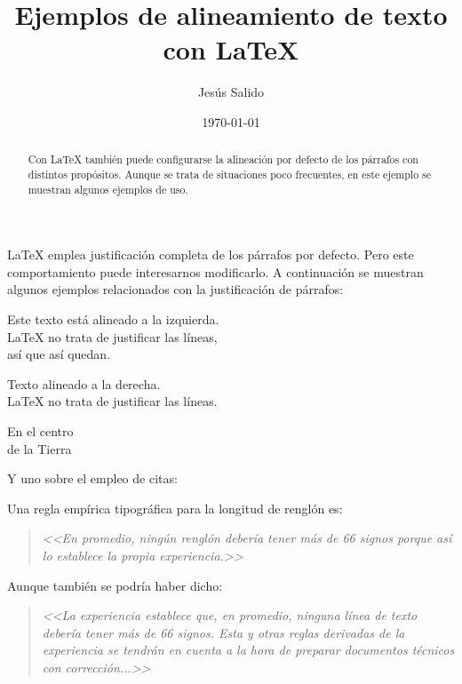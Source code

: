 \documentclass[11pt,a4paper]{article}
\title{Ejemplos de alineamiento de texto con \LaTeX}
\author{Jesús Salido}
\date{\today}
\begin{document}
\maketitle

\begin{abstract}
	Con \LaTeX{} también puede configurarse la alineación por defecto de los párrafos con distintos propósitos. Aunque se trata de situaciones poco frecuentes, en este ejemplo se muestran algunos ejemplos de uso.
\end{abstract}


\LaTeX{} emplea justificación completa de los párrafos por defecto. Pero este comportamiento puede interesarnos modificarlo. A continuación se muestran algunos ejemplos relacionados con la justificación de párrafos:

\begin{flushleft}
	Este texto está alineado a la izquierda. \\
	\LaTeX{} no trata de justificar las líneas, \\ 
	así que así quedan.
\end{flushleft}

\begin{flushright}
	Texto alineado a la derecha. \\
	\LaTeX{} no trata de justificar las líneas.
\end{flushright}

\begin{center}
	En el centro\\
	de la Tierra
\end{center}


\noindent Y uno sobre el empleo de citas:

Una regla empírica tipográfica para la longitud de renglón es:

\begin{quote}
\emph{	<<En promedio, ningún renglón debería tener más de 66 signos porque así lo establece la propia experiencia.>>}
\end{quote}


Aunque también se podría haber dicho:
\begin{quote}
\emph{	<<La experiencia establece que, en promedio, ninguna línea de texto debería tener más de 66 signos. Esta y otras reglas derivadas de la experiencia se tendrán en cuenta a la hora de preparar documentos técnicos con corrección...>>}
\end{quote}
\end{document}
